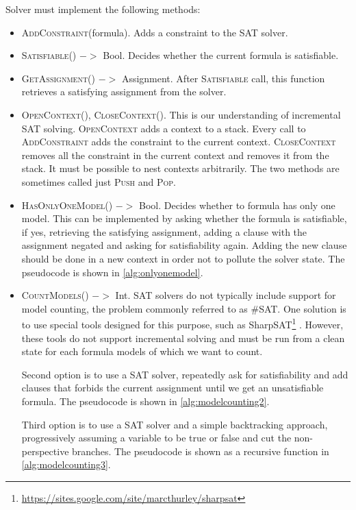 Solver must implement the following methods:
\begin{itemize}
\item \textsc{AddConstraint}(formula). Adds a constraint to the SAT solver.
\item \textsc{Satisfiable()} $->$ Bool. Decides whether the current formula is satisfiable.
\item \textsc{GetAssignment()} $->$ Assignment.
  After \textsc{Satisfiable} call, this function retrieves
  a satisfying assignment from the solver.
\item \textsc{OpenContext(), CloseContext()}.
  This is our understanding of incremental SAT solving.
  \textsc{OpenContext} adds a context to a stack.
  Every call to \textsc{AddConstraint} adds the constraint to the current context.
  \textsc{CloseContext} removes all the constraint in the current context and removes it
  from the stack. It must be possible to nest contexts arbitrarily.
  The two methods are sometimes called just \textsc{Push} and \textsc{Pop}.
\item \textsc{HasOnlyOneModel()} $->$ Bool. Decides whether to formula has only one model.
  This can be implemented by asking whether the formula is satisfiable,
  if yes, retrieving the satisfying assignment, adding
  a clause with the assignment negated and asking for satisfiability again.
  Adding the new clause should be done in a new context in order not to pollute
  the solver state. The pseudocode is shown in \autoref{alg:onlyonemodel}.

\item \textsc{CountModels()} $->$ Int.
SAT solvers do not typically include support for model counting, the problem
  commonly referred to as \#SAT.
One solution is to use
  special tools designed for this purpose,
  such as SharpSAT\footnote{\url{https://sites.google.com/site/marcthurley/sharpsat}}
  \cite{sharpsat}.
However, these tools do not support incremental solving and
  must be run from a clean state for each formula models of which we want to count.

Second option is to use a SAT solver, repeatedly ask for satisfiability and
  add clauses that forbids the current assignment until we get
  an unsatisfiable formula. The pseudocode is shown in \autoref{alg:modelcounting2}.

Third option is to use a SAT solver and a simple backtracking approach,
  progressively assuming a variable to be true or false and cut the non-perspective
  branches.
The pseudocode is shown as a recursive function in \autoref{alg:modelcounting3}.
\end{itemize}

